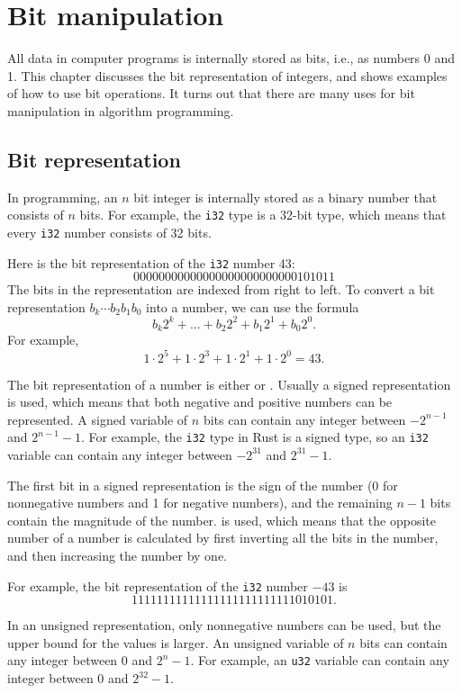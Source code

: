 \chapter{Bit manipulation}

All data in computer programs is internally stored as bits,
i.e., as numbers 0 and 1.
This chapter discusses the bit representation
of integers, and shows examples
of how to use bit operations.
It turns out that there are many uses for
bit manipulation in algorithm programming.

\section{Bit representation}


In programming, an $n$ bit integer is internally
stored as a binary number that consists of $n$ bits.
For example, the \texttt{i32} type is
a 32-bit type, which means that every \texttt{i32}
number consists of 32 bits.

Here is the bit representation of
the \texttt{i32} number 43: 
\[00000000000000000000000000101011\]
The bits in the representation are indexed from right to left.
To convert a bit representation $b_k \cdots b_2 b_1 b_0$ into a number,
we can use the formula
\[b_k 2^k + \ldots + b_2 2^2 + b_1 2^1 + b_0 2^0.\]
For example,
\[1 \cdot 2^5 + 1 \cdot 2^3 + 1 \cdot 2^1 + 1 \cdot 2^0 = 43.\]

The bit representation of a number is either
 or .
Usually a signed representation is used,
which means that both negative and positive
numbers can be represented.
A signed variable of $n$ bits can contain any
integer between $-2^{n-1}$ and $2^{n-1}-1$.
For example, the \texttt{i32} type in Rust is
a signed type, so an \texttt{i32} variable can contain any
integer between $-2^{31}$ and $2^{31}-1$.

The first bit in a signed representation
is the sign of the number (0 for nonnegative numbers
and 1 for negative numbers), and
the remaining $n-1$ bits contain the magnitude of the number.
 is used, which means that the
opposite number of a number is calculated by first
inverting all the bits in the number,
and then increasing the number by one.

For example, the bit representation of
the \texttt{i32} number $-43$ is
\[11111111111111111111111111010101.\]

In an unsigned representation, only nonnegative
numbers can be used, but the upper bound for the values is larger.
An unsigned variable of $n$ bits can contain any
integer between $0$ and $2^n-1$.
For example, an \texttt{u32} variable
can contain any integer between $0$ and $2^{32}-1$.

